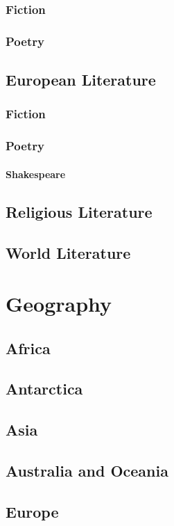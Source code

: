 \documentclass[12pt]{book}
\begin{document}
		\subsection{Fiction}
		\subsection{Poetry}
		
	\section{European Literature}
		\subsection{Fiction}
		\subsection{Poetry}
		\subsubsection{Shakespeare}
	\section{Religious Literature}
	\section{World Literature}
\chapter{Geography}
	\section{Africa}
	\section{Antarctica}
	\section{Asia}
	\section{Australia and Oceania}
	\section{Europe}
\end{document}
